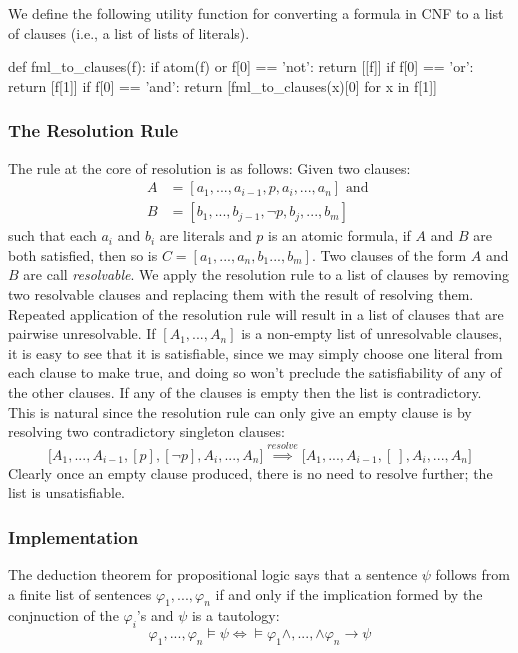\documentclass[a4paper,notitlepage]{scrartcl}
\let\phi\varphi
\begin{document}
We define the following utility function for converting a formula in CNF to
   a list of clauses (i.e., a list of lists of literals).
\begin{code}
def fml_to_clauses(f):
    if atom(f) or f[0] == 'not':
        return [[f]]
    if f[0] == 'or': 
        return [f[1]]
    if f[0] == 'and':
        return [fml_to_clauses(x)[0] for x in f[1]]
\end{code}


\subsubsection{The Resolution Rule}
The rule at the core of resolution is as follows:
Given two clauses:
\begin{align*}
A &= [a_1,...,a_{i-1}, p, a_{i},...,a_n]\text{ and }\\
B &= [b_1,...,b_{j-1},\lnot p, b_{j}, ..., b_m]
\end{align*}
such that each $a_i$ and $b_i$ are literals and $p$ is an atomic formula,
if $A$ and $B$ are both satisfied, then so 
   is $C = [a_1,..., a_n, b_1..., b_m]$.
Two clauses of the form $A$ and $B$ are call \emph{resolvable}.
We apply the resolution rule to a list of clauses by removing two resolvable
   clauses and replacing them with the result of resolving them.
Repeated application of the resolution rule will result in a list of clauses
   that are pairwise unresolvable.
If $[A_1,...,A_n]$ is a non-empty list of unresolvable clauses, it is easy 
   to see that it is satisfiable, since we may simply choose one literal 
   from each clause to make true, and doing so won't preclude the 
   satisfiability of any of the other clauses.
If any of the clauses is empty then the list is contradictory.
This is natural since the resolution rule can only give an
   empty clause is by resolving two contradictory singleton clauses:
\[
\big[A_1,..., A_{i-1}, [p], [\lnot p], A_i,..., A_n\big] \overset{resolve}\implies
\big[A_1,..., A_{i-1}, [\ ], A_i,..., A_n\big]
\]
Clearly once an empty clause produced, there is no need to resolve further;
   the list is unsatisfiable.

\subsubsection{Implementation}

The deduction theorem for propositional logic says that a sentence $\psi$
   follows from a finite list of sentences $\phi_1,...,\phi_n$ if and only
   if the implication formed by the conjnuction of the $\phi_i$'s and $\psi$
   is a tautology:
\[
\phi_1,...,\phi_n\models\psi \iff \models\phi_1\land,...,\land\phi_n
   \rightarrow\psi
\]
\end{document}
